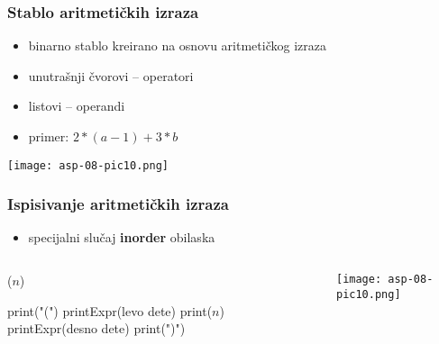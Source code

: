 \documentclass[compress,aspectratio=169]{beamer}
\begin{document}
\begin{frame}[fragile]
  \frametitle{Stablo aritmetičkih izraza}
  \begin{itemize}
    \item binarno stablo kreirano na osnovu aritmetičkog izraza
    \item unutrašnji čvorovi -- operatori
    \item listovi -- operandi
    \item primer: $2 * (a - 1) + 3 * b$
  \end{itemize}
  \begin{center}
    \texttt{[image: asp-08-pic10.png]}
  \end{center}
\end{frame}

\begin{frame}[fragile]
  \frametitle{Ispisivanje aritmetičkih izraza}
  \begin{itemize}
    \item specijalni slučaj \textbf{inorder} obilaska
  \end{itemize}
\begin{columns}
  \begin{column}[c]{5cm}
    ($n$)
    \begin{algorithmic}
      \STATE print("(")
      \STATE printExpr(levo dete)
    \ENDIF
    \STATE print($n$)
      \STATE printExpr(desno dete)
      \STATE print(")")
    \ENDIF
    \end{algorithmic}
  \end{column}
  \begin{column}[c]{6cm}
    \begin{center}
      \texttt{[image: asp-08-pic10.png]}
    \end{center}
  \end{column}
\end{columns}
\end{frame}
\end{document}
